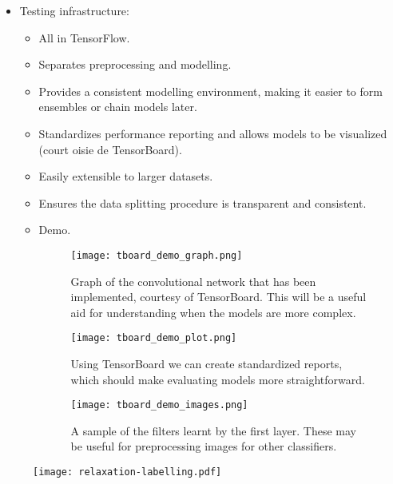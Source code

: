 \documentclass[11pt]{article} %
\begin{document}
\begin{itemize}
\begin{itemize}
\begin{figure}[t!]
\begin{subfigure}[t]{0.3\textwidth}
			\texttt{[image: unfiltered\_input\_to\_GDA.png]}
			\caption{Query image.}
   			\label{fig:c} 
		\end{subfigure}
		\begin{subfigure}[t]{0.3\textwidth}
			\texttt{[image: GDA\_unfiltered\_log\_odds.png]}
			\caption{Log-odds of query image.}
   			\label{fig:d} 
		\end{subfigure}
		\end{figure}
	\item Testing infrastructure:
		\begin{itemize}
			\item All in TensorFlow.
			\item Separates preprocessing and modelling.
			\item Provides a consistent modelling environment, making it easier to form ensembles or chain models later.
			\item Standardizes performance reporting and allows models to be visualized (court oisie de TensorBoard).
			\item Easily extensible to larger datasets.
			\item Ensures the data splitting procedure is transparent and consistent.
			\item Demo.
			\begin{figure}
			\centering
				\texttt{[image: tboard\_demo\_graph.png]}
				\caption{Graph of the convolutional network that has been implemented, courtesy of TensorBoard. This will be a useful aid for understanding when the models are more complex.}
			\end{figure}
			\begin{figure}
				\texttt{[image: tboard\_demo\_plot.png]}
				\caption{Using TensorBoard we can create standardized reports, which should make evaluating models more straightforward.}
			\end{figure}
			\begin{figure}
				\texttt{[image: tboard\_demo\_images.png]}
				\caption{A sample of the filters learnt by the first layer. These may be useful for preprocessing images for other classifiers.}
			\end{figure}
		\end{itemize}
	\end{itemize}
\end{itemize}

\begin{figure}
	\texttt{[image: relaxation-labelling.pdf]}
\end{figure}
\end{document}
